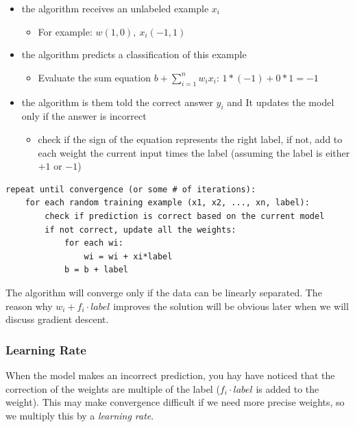 \documentclass{article}
\begin{document}
\begin{itemize}
\tightlist
\item
  the algorithm receives an unlabeled example \(x_i\)

  \begin{itemize}
  \tightlist
  \item
    For example: \(w(1, 0),\ x_i(-1,1)\)
  \end{itemize}
\item
  the algorithm predicts a classification of this example

  \begin{itemize}
  \tightlist
  \item
    Evaluate the sum equation \(b+\sum_{i=1}^n w_ix_i\):
    \(1*(-1)+0*1 = -1\)
  \end{itemize}
\item
  the algorithm is them told the correct answer \(y_i\) and It updates
  the model only if the answer is incorrect

  \begin{itemize}
  \tightlist
  \item
    check if the sign of the equation represents the right label, if
    not, add to each weight the current input times the label (assuming
    the label is either \(+1\) or \(-1\))
  \end{itemize}
\end{itemize}

\begin{verbatim}
repeat until convergence (or some # of iterations):
    for each random training example (x1, x2, ..., xn, label):
        check if prediction is correct based on the current model
        if not correct, update all the weights:
            for each wi:
                wi = wi + xi*label
            b = b + label
\end{verbatim}

The algorithm will converge only if the data can be linearly separated.
The reason why \(w_i + f_i\cdot label\) improves the solution will be
obvious later when we will discuss gradient descent.

\subsubsection{Learning Rate}\label{learning-rate}

When the model makes an incorrect prediction, you hay have noticed that
the correction of the weights are multiple of the label
(\(f_i\cdot label\) is added to the weight). This may make convergence
difficult if we need more precise weights, so we multiply this by a
\emph{learning rate}.
\end{document}
